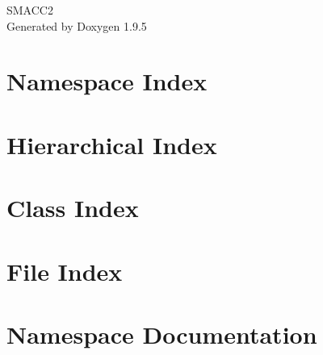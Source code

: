 \documentclass[twoside]{book}
\newcommand{\+}{\discretionary{\mbox{\scriptsize$\hookleftarrow$}}{}{}}
\newcommand{\clearemptydoublepage}{%
    \newpage{\pagestyle{empty}\cleardoublepage}%
  }
\begin{document}
  \raggedbottom
    \hypersetup{pageanchor=false,
                bookmarksnumbered=true,
                pdfencoding=unicode
               }
  \begin{titlepage}
  \vspace*{7cm}
  \begin{center}%
  {\Large SMACC2}\\
  \vspace*{1cm}
  {\large Generated by Doxygen 1.9.5}\\
  \end{center}
  \end{titlepage}
  \clearemptydoublepage
  \tableofcontents
  \clearemptydoublepage
  \hypersetup{pageanchor=true}
\chapter{Namespace Index}

\chapter{Hierarchical Index}

\chapter{Class Index}

\chapter{File Index}

\chapter{Namespace Documentation}
























\end{document}

